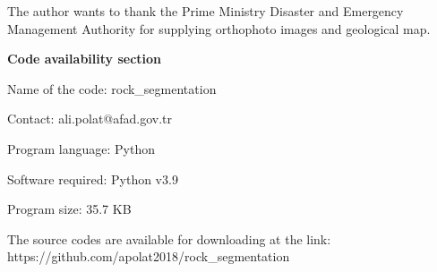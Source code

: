 \documentclass[a4paper,fleqn]{cas-sc}
\begin{document}
The author wants to thank the Prime Ministry Disaster and Emergency Management Authority for supplying orthophoto images and geological map.

\newpage

\textbf{Code availability section}

Name of the code: rock\_segmentation

Contact: ali.polat@afad.gov.tr

Program language: Python
 
Software required: Python v3.9

Program size: 35.7 KB

The source codes are available for downloading at the link:
https://github.com/apolat2018/rock\_segmentation



 
\end{document}
